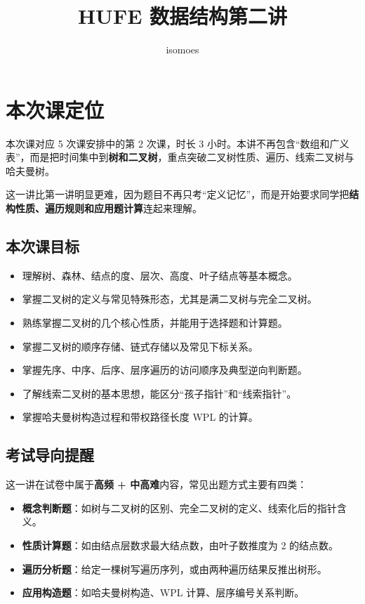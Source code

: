 \documentclass{../../note}
\title{HUFE 数据结构第二讲}
\author{isomoes}
\begin{document}
\maketitle

\section{本次课定位}

本次课对应 5 次课安排中的第 2 次课，时长 3 小时。本讲不再包含“数组和广义表”，而是把时间集中到\textbf{树和二叉树}，重点突破二叉树性质、遍历、线索二叉树与哈夫曼树。

这一讲比第一讲明显更难，因为题目不再只考“定义记忆”，而是开始要求同学把\textbf{结构性质、遍历规则和应用题计算}连起来理解。

\subsection{本次课目标}

\begin{itemize}
  \item 理解树、森林、结点的度、层次、高度、叶子结点等基本概念。
  \item 掌握二叉树的定义与常见特殊形态，尤其是满二叉树与完全二叉树。
  \item 熟练掌握二叉树的几个核心性质，并能用于选择题和计算题。
  \item 掌握二叉树的顺序存储、链式存储以及常见下标关系。
  \item 掌握先序、中序、后序、层序遍历的访问顺序及典型逆向判断题。
  \item 了解线索二叉树的基本思想，能区分“孩子指针”和“线索指针”。
  \item 掌握哈夫曼树构造过程和带权路径长度 WPL 的计算。
\end{itemize}

\subsection{考试导向提醒}

这一讲在试卷中属于\textbf{高频 + 中高难}内容，常见出题方式主要有四类：

\begin{itemize}
  \item \textbf{概念判断题}：如树与二叉树的区别、完全二叉树的定义、线索化后的指针含义。
  \item \textbf{性质计算题}：如由结点层数求最大结点数，由叶子数推度为 2 的结点数。
  \item \textbf{遍历分析题}：给定一棵树写遍历序列，或由两种遍历结果反推出树形。
  \item \textbf{应用构造题}：如哈夫曼树构造、WPL 计算、层序编号关系判断。
\end{itemize}
\end{document}
